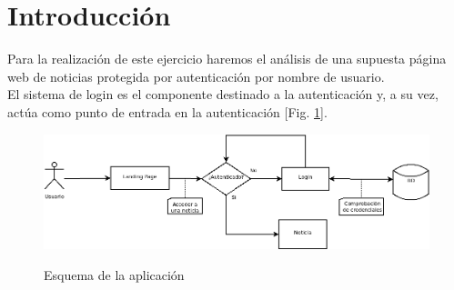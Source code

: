 \documentclass[a4paper,oneside]{article}
\begin{document}

\section{Introducción}
\label{section:intro}

Para la realización de este ejercicio haremos el análisis de una supuesta página web de noticias protegida por autenticación por nombre de usuario.\\
El sistema de login es el componente destinado a la autenticación y, a su vez, actúa como punto de entrada en la autenticación [Fig.  \ref{fig:schema}].

\begin{figure}[h!]
  \centering
  \includegraphics[scale=0.4]{images/diagram.png}\\
  \caption{Esquema de la aplicación}
  \label{fig:schema}
\end{figure}
\end{document}
